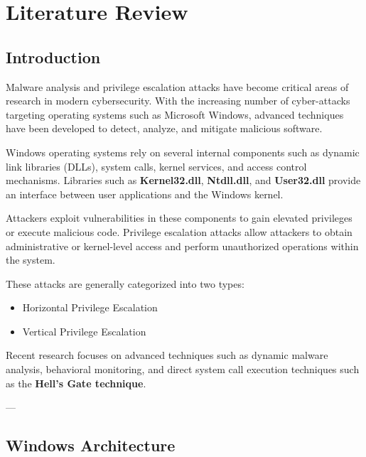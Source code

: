 
\chapter{Literature Review}\doublespacing %

\label{Chapter2} %


\section{Introduction}

Malware analysis and privilege escalation attacks have become critical areas of research in modern cybersecurity. 
With the increasing number of cyber-attacks targeting operating systems such as Microsoft Windows, advanced 
techniques have been developed to detect, analyze, and mitigate malicious software.

Windows operating systems rely on several internal components such as dynamic link libraries (DLLs), system calls, 
kernel services, and access control mechanisms. Libraries such as \textbf{Kernel32.dll}, \textbf{Ntdll.dll}, and 
\textbf{User32.dll} provide an interface between user applications and the Windows kernel.

Attackers exploit vulnerabilities in these components to gain elevated privileges or execute malicious code. 
Privilege escalation attacks allow attackers to obtain administrative or kernel-level access and perform 
unauthorized operations within the system.

These attacks are generally categorized into two types:

\begin{itemize}
\item Horizontal Privilege Escalation
\item Vertical Privilege Escalation
\end{itemize}

Recent research focuses on advanced techniques such as dynamic malware analysis, behavioral monitoring, 
and direct system call execution techniques such as the \textbf{Hell's Gate technique}.

---


\section{Windows Architecture}


